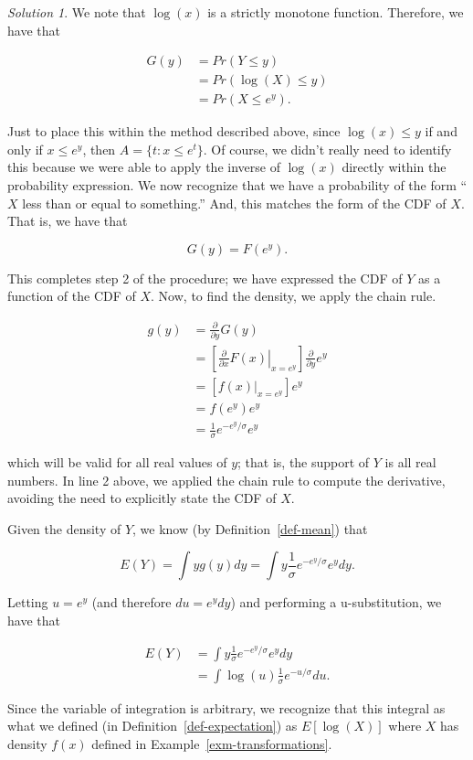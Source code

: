 \documentclass[
  letterpaper,
  DIV=11,
  numbers=noendperiod]{scrreprt}
\theoremstyle{definition}
\theoremstyle{definition}
\theoremstyle{plain}
\theoremstyle{remark}
\newtheorem*{solution}{Solution}
\begin{document}
\begin{solution}

We note that \(\log(x)\) is a strictly monotone function. Therefore, we
have that

\[
\begin{aligned}
  G(y) &= Pr(Y \leq y) \\
    &= Pr(\log(X) \leq y) \\
    &= Pr\left(X \leq e^y\right).
\end{aligned}
\]

Just to place this within the method described above, since
\(\log(x) \leq y\) if and only if \(x \leq e^y\), then
\(A = \{t: x \leq e^t\}\). Of course, we didn't really need to identify
this because we were able to apply the inverse of \(\log(x)\) directly
within the probability expression. We now recognize that we have a
probability of the form ``\(X\) less than or equal to something.'' And,
this matches the form of the CDF of \(X\). That is, we have that

\[G(y) = F\left(e^y\right).\]

This completes step 2 of the procedure; we have expressed the CDF of
\(Y\) as a function of the CDF of \(X\). Now, to find the density, we
apply the chain rule.

\[
\begin{aligned}
  g(y) 
    &= \frac{\partial}{\partial y} G(y) \\
    &= \left[\left.\frac{\partial}{\partial x} F(x)\right|_{x = e^y}\right] \frac{\partial}{\partial y} e^y \\
    &= \left[\left. f(x) \right|_{x = e^y}\right] e^y \\
    &= f\left(e^y\right) e^y \\
    &= \frac{1}{\sigma} e^{-e^y/\sigma} e^y
\end{aligned}
\]

which will be valid for all real values of \(y\); that is, the support
of \(Y\) is all real numbers. In line 2 above, we applied the chain rule
to compute the derivative, avoiding the need to explicitly state the CDF
of \(X\).

Given the density of \(Y\), we know (by Definition~\ref{def-mean}) that

\[E(Y) = \int y g(y) dy = \int y \frac{1}{\sigma} e^{-e^{y}/\sigma} e^{y} dy.\]

Letting \(u = e^y\) (and therefore \(du = e^y dy\)) and performing a
u-substitution, we have that

\[
\begin{aligned}
  E(Y)
    &= \int y\frac{1}{\sigma} e^{-e^{y}/\sigma} e^{y} dy \\
    &= \int \log(u) \frac{1}{\sigma} e^{-u / \sigma} du.
\end{aligned}
\]

Since the variable of integration is arbitrary, we recognize that this
integral as what we defined (in Definition~\ref{def-expectation}) as
\(E\left[\log(X)\right]\) where \(X\) has density \(f(x)\) defined in
Example~\ref{exm-transformations}.

\end{solution}
\end{document}
